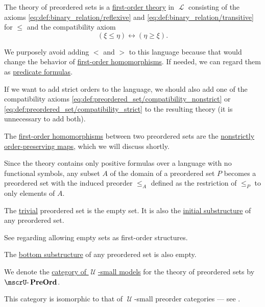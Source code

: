 \begin{definition}
\begin{thmenum}
    The theory of preordered sets is a \hyperref[def:first_order_theory]{first-order theory} in \( \mscrL \) consisting of the axioms \eqref{eq:def:binary_relation/reflexive} and \eqref{eq:def:binary_relation/transitive} for \( \leq \) and the compatibility axiom
    \begin{equation}\label{eq:def:preordered_set/theory}
      (\xi \leq \eta) \leftrightarrow (\eta \geq \xi).
    \end{equation}

    We purposely avoid adding \( < \) and \( > \) to this language because that would change the behavior of \hyperref[def:first_order_homomorphism]{first-order homomorphisms}. If needed, we can regard them as \hyperref[rem:predicate_formula]{predicate formulas}.

    If we want to add strict orders to the language, we should also add one of the compatibility axioms \eqref{eq:def:preordered_set/compatibility_nonstrict} or \eqref{eq:def:preordered_set/compatibility_strict} to the resulting theory (it is unnecessary to add both).

     The \hyperref[def:first_order_homomorphism]{first-order homomorphisms} between two preordered sets are the \hyperref[def:order_homomorphism/increasing]{nonstrictly order-preserving maps}, which we will discuss shortly.

     Since the theory contains only positive formulas over a language with no functional symbols, any subset \( A \) of the domain of a preordered set \( P \) becomes a preordered set with the induced preorder \( \leq_A \) defined as the restriction of \( \leq_P \) to only elements of \( A \).

     The \hyperref[rem:trivial_structure]{trivial} preordered set is the empty set. It is also the \hyperref[thm:substructures_form_complete_lattice/bottom]{initial substructure} of any preordered set.

    See  regarding allowing empty sets as first-order structures.

     The \hyperref[thm:substructures_form_complete_lattice/bottom]{bottom substructure} of any preordered set is also empty.

      We denote the \hyperref[def:category_of_small_first_order_models]{category of \( \mscrU \)-small models} for the theory of preordered sets by \( \ucat{PreOrd} \).

    This category is isomorphic to that of \( \mscrU \)-small preorder categories --- see .
  \end{thmenum}
\end{definition}

